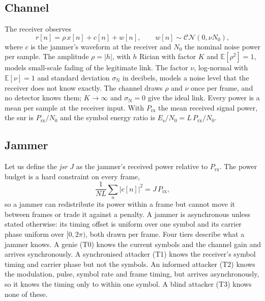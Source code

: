 \subsection{Channel} \label{sec:sysmodel:channel}
The receiver observes
\begin{equation}
r[n]=\rho\,x[n]+c[n]+w[n],\qquad w[n]\sim\mathcal{CN}(0,\nu N_0),
\label{eq:rx}
\end{equation}
where $c$ is the jammer's waveform at the receiver and $N_0$ the nominal noise power per sample.
The amplitude $\rho=|h|$, with $h$ Rician with factor $K$ and $\mathbb{E}[\rho^2]=1$, models small-scale fading of the legitimate link.
The factor $\nu$, log-normal with $\mathbb{E}[\nu]=1$ and standard deviation $\sigma_\text{N}$ in decibels, models a noise level that the receiver does not know exactly.
The channel draws $\rho$ and $\nu$ once per frame, and no detector knows them; $K\to\infty$ and $\sigma_\text{N}=0$ give the ideal link.
Every power is a mean per sample at the receiver input.
With $P_\text{rx}$ the mean received signal power, the \ac{snr} is $P_\text{rx}/N_0$ and the symbol energy ratio is $E_\text{s}/N_0=L\,P_\text{rx}/N_0$.

\subsection{Jammer} \label{sec:sysmodel:jammer}
Let us define the \textit{\ac{jsr}} $J$ as the jammer's received power relative to $P_\text{rx}$.
The power budget is a hard constraint on every frame,
\begin{equation}
\frac{1}{NL}\sum_{n}|c[n]|^2=J\,P_\text{rx},
\label{eq:power}
\end{equation}
so a jammer can redistribute its power within a frame but cannot move it between frames or trade it against a penalty.
A jammer is asynchronous unless stated otherwise: its timing offset is uniform over one symbol and its carrier phase uniform over $[0,2\pi)$, both drawn per frame.
Four tiers describe what a jammer knows.
A genie (T0) knows the current symbols and the channel gain and arrives synchronously.
A synchronised attacker (T1) knows the receiver's symbol timing and carrier phase but not the symbols.
An informed attacker (T2) knows the modulation, pulse, symbol rate and frame timing, but arrives asynchronously, so it knows the timing only to within one symbol.
A blind attacker (T3) knows none of these.

